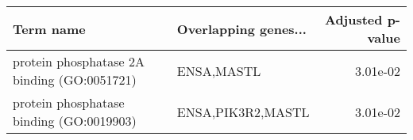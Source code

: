 \begin{tabular}{llr}
\toprule
                                  Term name & Overlapping genes... &  Adjusted p-value \\
\midrule
protein phosphatase 2A binding (GO:0051721) &           ENSA,MASTL &          3.01e-02 \\
   protein phosphatase binding (GO:0019903) &    ENSA,PIK3R2,MASTL &          3.01e-02 \\
\bottomrule
\end{tabular}
